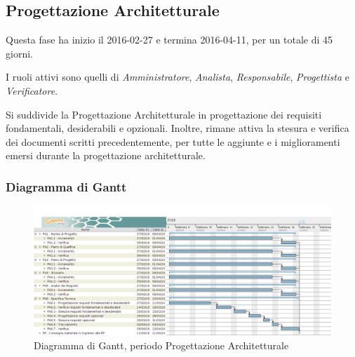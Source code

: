 \newpage

\subsection{Progettazione Architetturale}
Questa fase ha inizio il 2016-02-27 e termina 2016-04-11, per un totale di 45 giorni.

I ruoli attivi sono quelli di \textit{Amministratore}, \textit{Analista}, \textit{Responsabile}, \textit{Progettista} e \textit{Verificatore}.

Si suddivide la Progettazione Architetturale in progettazione dei requisiti fondamentali, desiderabili e opzionali. Inoltre, rimane attiva la stesura e verifica dei documenti scritti precedentemente, per tutte le aggiunte e i miglioramenti emersi durante la progettazione architetturale.

\subsubsection{Diagramma di Gantt}
\begin{figure}[ht!]
  \includegraphics[width=1\textwidth]{res/img/pianificazione/ProgettazioneArchitetturale}
  \caption{Diagramma di Gantt, periodo Progettazione Architetturale}
\end{figure}

